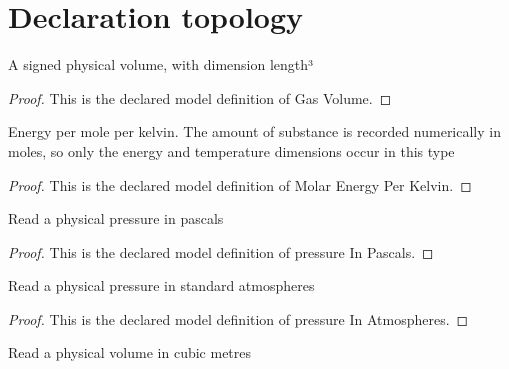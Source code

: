\section{Declaration topology}
\begin{definition}
  \label{def:physics:phyx-mini-0353:phyxminiproblems-problemphyxmini0353-gasvolume}
  A signed physical volume, with dimension length³
\end{definition}
\begin{proof}
  This is the declared model definition of Gas Volume.
\end{proof}
\begin{definition}
  \label{def:physics:phyx-mini-0353:phyxminiproblems-problemphyxmini0353-molarenergyperkelvin}
  Energy per mole per kelvin. The amount of substance is recorded numerically in moles, so only the energy and temperature dimensions occur in this type
\end{definition}
\begin{proof}
  This is the declared model definition of Molar Energy Per Kelvin.
\end{proof}
\begin{definition}
  \label{def:physics:phyx-mini-0353:phyxminiproblems-problemphyxmini0353-pressureinpascals}
  Read a physical pressure in pascals
\end{definition}
\begin{proof}
  This is the declared model definition of pressure In Pascals.
\end{proof}
\begin{definition}
  \label{def:physics:phyx-mini-0353:phyxminiproblems-problemphyxmini0353-pressureinatmospheres}
  Read a physical pressure in standard atmospheres
\end{definition}
\begin{proof}
  This is the declared model definition of pressure In Atmospheres.
\end{proof}
\begin{definition}
  \label{def:physics:phyx-mini-0353:phyxminiproblems-problemphyxmini0353-volumeincubicmeters}
  Read a physical volume in cubic metres
\end{definition}
